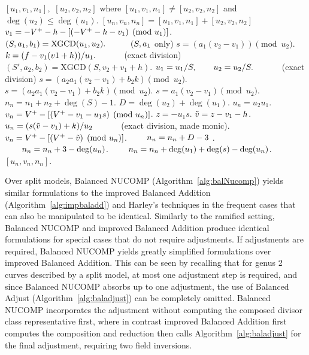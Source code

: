     
\begin{algorithm}[htbp]
\caption{Genus 2 Split Model Addition (Positive Reduced Balanced NUCOMP)}
\label{alg:g2balnucomp}
\begin{algorithmic}[1]
\Require $[u_1,v_1,n_1],$ $[u_2,v_2,n_2]$ where $[u_1,v_1,n_1] \neq [u_2,v_2,n_2]$ and $\deg(u_2) \leq \deg(u_1)$.
\Ensure $[u_n,v_n,n_n] = [u_1,v_1,n_1] + [u_2,v_2,n_2]$
    \State $v_1 = -V^{+} - h - [(-V^{+} - h - v_1) \pmod{u_1}]$.
\EndIf
\State $(S,a_1,b_1) = \mathrm{XGCD}(u_1,u_2). \quad\quad\quad  (S, a_1$ only)
\State $s = (a_1(v_2 - v_1)) \pmod{u_2}$.
\State $k = (f - v_1(v1 + h))/u_1. \quad\quad\quad$ (exact division)
    \State $(S',a_2,b_2) = \mathrm{XGCD}(S,v_2 + v_1 + h)$.
        \State $u_1 = u_1/S, \quad\quad u_2 = u_2/S. \quad\quad\quad$ (exact division)
        \State $s = (a_2a_1(v_2 - v_1) + b_2k) \pmod{u_2}$.
    \Else
        \State $s = (a_2a_1(v_2 - v_1) + b_2k) \pmod{u_2}$.
    \EndIf
\Else
    \State $s = a_1(v_2 - v_1) \pmod{u_2}$.
\EndIf
\State $n_n = n_1 + n_2 + \deg(S) - 1$.
\State $D = \deg(u_2) + \deg(u_1)$.
    \State $u_n = u_2u_1$.
    \State $v_n = V^{+} - [(V^{+} - v_1 - u_1s) \pmod{u_n}]$.
\Else
    \State $z = -u_1s$.
    \State $\tilde{v} = z - v_1 - h$.
    \State $u_n = (s(\tilde{v} - v_1) + k)/u_2 \quad\quad\quad$ (exact division, made monic).
    \State $v_n = V^{+} - [(V^{+} - \tilde{v}) \pmod{u_n}]$.
         $\quad\quad n_n = n_n + D - 3$ .
        \Else \hspace{101pt} $\quad\quad n_n = n_n + 3 - \deg(u_n)$. 
        \EndIf
    \Else $\quad\quad n_n = n_n + \deg(u_1) + \deg(s) - \deg(u_n)$.
    \EndIf
\EndIf
\State \Return $[u_n,v_n,n_n]$.
\end{algorithmic}
\end{algorithm}

\newpage
 
Over split models, Balanced NUCOMP (Algorithm~\ref{alg:balNucomp}) yields
similar formulations to the improved Balanced Addition
(Algorithm~\ref{alg:impbaladd}) and Harley's techniques in the frequent cases
that can also be manipulated to be identical. Similarly to the ramified setting,
Balanced NUCOMP and improved Balanced Addition produce identical formulations
for special cases that do not require adjustments. If adjustments are required,
Balanced NUCOMP yields greatly simplified formulations over improved Balanced
Addition. This can be seen by recalling that for genus 2 curves described by
a split model, at most one adjustment step is required, and since Balanced
NUCOMP absorbs up to one adjustment, the use of Balanced Adjust
(Algorithm~\ref{alg:baladjust}) can be completely omitted. Balanced NUCOMP
incorporates the adjustment without computing the composed divisor class
representative first, where in contrast improved Balanced Addition first
computes the composition and reduction then calls Algorithm~\ref{alg:baladjust}
for the final adjustment, requiring two field inversions. 

